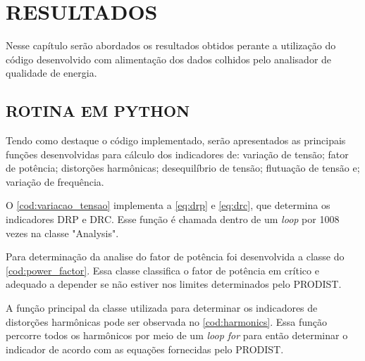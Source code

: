 \chapter{RESULTADOS}

Nesse capítulo serão abordados os resultados obtidos perante a utilização do código desenvolvido com alimentação dos dados colhidos pelo analisador de qualidade de energia.

\section{ROTINA EM PYTHON}

Tendo como destaque o código implementado, serão apresentados as principais funções desenvolvidas para cálculo dos indicadores de: variação de tensão; fator de potência; distorções harmônicas; desequilíbrio de tensão; flutuação de tensão e; variação de frequência.

O \autoref{cod:variacao_tensao} implementa a \autoref{eq:drp} e \autoref{eq:drc}, que determina os indicadores DRP e DRC. Esse função é chamada dentro de um \textit{loop} por 1008 vezes na classe "Analysis".

\begin{codigo}
\end{codigo}


Para determinação da analise do fator de potência foi desenvolvida a classe do \autoref{cod:power_factor}. Essa classe classifica o fator de potência em crítico e adequado a depender se não estiver nos limites determinados pelo PRODIST.

\begin{codigo}
\end{codigo}

A função principal da classe utilizada para determinar os indicadores de distorções harmônicas pode ser observada no \autoref{cod:harmonics}. Essa função percorre todos os harmônicos por meio de um \textit{loop for} para então determinar o indicador de acordo com as equações fornecidas pelo PRODIST.

\begin{codigo}
\end{codigo}

